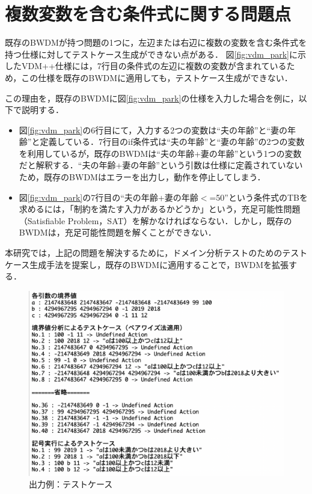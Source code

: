 \documentclass[uplatex, report, a4j, 10pt]{jsbook}
\begin{document}
\section{複数変数を含む条件式に関する問題点}
既存のBWDMが持つ問題の1つに，左辺または右辺に複数の変数を含む条件式を持つ仕様に対してテストケース生成ができない点がある．
図\ref{fig:vdm_park}に示したVDM++仕様には，7行目の条件式の左辺に複数の変数が含まれているため，この仕様を既存のBWDMに適用しても，テストケース生成ができない．

この理由を，既存のBWDMに図\ref{fig:vdm_park}の仕様を入力した場合を例に，以下で説明する．

\begin{itemize}
  \item 図\ref{fig:vdm_park}の6行目にて，入力する2つの変数は“夫の年齢”と“妻の年齢”と定義している．7行目のif条件式は“夫の年齢”と“妻の年齢”の2つの変数を利用しているが，既存のBWDMは“夫の年齢+妻の年齢”という1つの変数だと解釈する．“夫の年齢+妻の年齢”という引数は仕様に定義されていないため，既存のBWDMはエラーを出力し，動作を停止してしまう．
  \item 図\ref{fig:vdm_park}の7行目の“夫の年齢+妻の年齢$<$=50”という条件式のTBを求めるには，「制約を満たす入力があるかどうか」という，充足可能性問題（Satisfiable Problem，SAT）を解かなければならない．しかし，既存のBWDMは，充足可能性問題を解くことができない．
\end{itemize}

本研究では，上記の問題を解決するために，ドメイン分析テストのためのテストケース生成手法を提案し，既存のBWDMに適用することで，BWDMを拡張する．


\begin{figure}[t]
  \begin{center}
    \includegraphics[keepaspectratio, width=160mm]{figs/sample_testcase.png}
    \caption{出力例：テストケース}
    \label{fig:testcase_sample}
  \end{center}
\end{figure}
\end{document}
